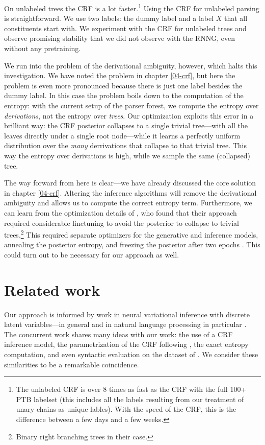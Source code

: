     On unlabeled trees the CRF is a lot faster.\footnote{The unlabeled CRF is over 8 times as fast as the CRF with the full 100+ PTB labelset (this includes all the labels resulting from our treatment of unary chains as unique lables). With the speed of the CRF, this is the difference between a few days and a few weeks.} Using the CRF for unlabeled parsing is straightforward. We use two labels: the dummy label and a label $X$ that all constituents start with. We experiment with the CRF for unlabeled trees and observe promising stability that we did not observe with the RNNG, even without any pretraining.

    We run into the problem of the derivational ambiguity, however, which halts this investigation. We have noted the problem in chapter \ref{04-crf}, but here the problem is even more pronounced because there is just one label besides the dummy label. In this case the problem boils down to the computation of the entropy: with the current setup of the parser forest, we compute the entropy over \textit{derivations}, not the entropy over \textit{trees}. Our optimization exploits this error in a brilliant way: the CRF posterior collapses to a single trivial tree---with all the leaves directly under a single root node---while it learns a perfectly uniform distribution over the \textit{many} derrivations that collapse to that trivial tree. This way the entropy over derivations is high, while we sample the same (collapsed) tree.

    The way forward from here is clear---we have already discussed the core solution in chapter \ref{04-crf}. Altering the inference algorithms will remove the derivational ambiguity and allows us to compute the correct entropy term. Furthermore, we can learn from the optimization details of \citet{kim2019unsupervised}, who found that their approach required considerable finetuning to avoid the posterior to collapse to trivial trees.\footnote{Binary right branching trees in their case.} This required separate optimizers for the generative and inference models, annealing the posterior entropy, and freezing the posterior after two epochs \citep{kim2019unsupervised}. This could turn out to be necessary for our approach as well.

\section{Related work}
  Our approach is informed by work in neural variational inference with discrete latent variables---in general \citep{paisley2012viss,mnih2014nvil,ranganath2014black,mnih2016variational} and in natural language processing in particular \citep{miao2016discrete,yin2018structvae}. The concurrent work \citet{kim2019unsupervised} shares many ideas with our work: the use of a CRF inference model, the parametrization of the CRF following \citet{stern2017minimal}, the exact entropy computation, and even syntactic evaluation on the dataset of \citet{linzen2018targeted}. We consider these similarities to be a remarkable coincidence.

